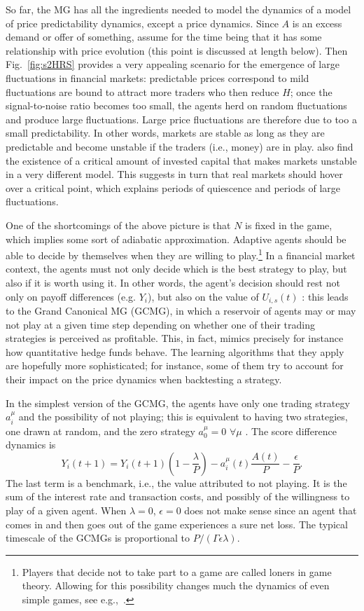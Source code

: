 \documentclass[aps,twocolumn,nofootinbib,sortedaddress,reprint]{revtex4-1}
\begin{document}
So far, the MG has all the ingredients needed to model the dynamics of
a model of price predictability dynamics, except a price
dynamics. Since $A$ is an excess demand or offer of something, assume
for the time being that it has some relationship with price evolution
(this point is discussed at length below). Then Fig.\ \ref{fig:s2HRS}
provides a very appealing scenario for the emergence of large
fluctuations in financial markets: predictable prices correspond to
mild fluctuations are bound to attract more traders who then
reduce $H$; once the signal-to-noise ratio becomes too small, the
agents herd on random fluctuations and produce large fluctuations. Large price fluctuations are therefore due
to too a small predictability. In other words, markets are stable as
long as they are predictable and become unstable if the
traders (i.e., money) are in play. \textcite{MarsiliInstabMarkets} also
  find the existence of a critical amount of invested capital that
  makes markets unstable in a very different model. This suggests in
turn that real markets should hover over  a critical point, which
explains periods of quiescence and periods of large fluctuations.

One of the shortcomings of the above picture is that $N$ is fixed in
the game, which implies some sort of adiabatic approximation. Adaptive
agents should be able to decide by themselves when they are willing to
play.\footnote{Players that decide not to take part to a game are
  called loners in game theory. Allowing for this possibility changes
  much the dynamics of even simple games, see e.g.,~\textcite{HauertLonerPRL}.} In a
financial market context, the agents must not only decide which is the
best strategy to play, but also if it is worth using it. In other words,
the agent's decision should rest not only on payoff differences
(e.g. $Y_i$), but also on the value of $U_{i,s}(t)$
\cite{SZ00,J99,J00}: this leads to the Grand Canonical MG (GCMG), in
which a reservoir of agents may or may not play  at a given time step
depending on whether one of their trading strategies is perceived as
profitable. This, in fact, mimics precisely for instance how
quantitative hedge funds behave. The learning algorithms that
  they apply are hopefully more sophisticated; for instance, some of
  them try to account for their impact on the price dynamics when
  backtesting a strategy.

  In the simplest version of the GCMG, the
agents have only one trading strategy $a_i^\mu$ and the possibility of
not playing; this is equivalent to having two strategies, one drawn at
random, and the zero strategy $a_0^\mu=0$ $\forall \mu$
\cite{CM03}. The score difference dynamics is
\begin{equation}
Y_i(t+1)=Y_i(t+1)\left(1-\frac{\lambda}{P}\right)-a_i^\mu(t)\frac{A(t)}{P}-\frac{\epsilon}{P}.
\end{equation}
The last term is a benchmark, i.e., the value attributed to not
playing. It is the sum of the interest rate and transaction costs, and
possibly of the willingness to play of a given agent. When
$\lambda=0$, $\epsilon=0$ does not make sense since an agent that
comes in and then goes out of the game experiences a sure net loss.
The typical timescale of the GCMGs is proportional to
$P/(\Gamma\epsilon\lambda)$.
\end{document}
